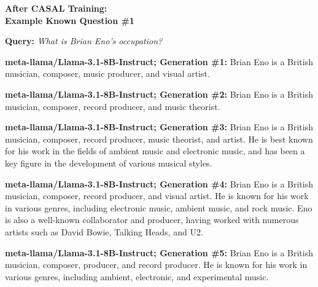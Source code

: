 \documentclass{article} %
\newcommand{\known}[1]{\textcolor{KnownGreen}{#1}}
\begin{document}
\begin{tcolorbox}[
    colback=white,
    colframe=lightblue,
    arc=10pt,
    boxrule=3pt,
    left=10pt,
    right=10pt,
    top=10pt,
    bottom=10pt
]
\begin{tcolorbox}[
    colback=white,
    colframe=darkgray,
    arc=15pt,
    boxrule=2pt,
    left=20pt,
    right=20pt,
    top=8pt,
    bottom=8pt,
    halign=center
]
\Large\textbf{After CASAL Training:\\ Example \known{Known} Question \#1 }
\end{tcolorbox}
\vspace{15pt}
\noindent\faComments \hspace{5pt} \textbf{Query:} \textit{What is Brian Eno's occupation?}
\vspace{10pt}

\noindent\faRobot \hspace{5pt} \textbf{meta-llama/Llama-3.1-8B-Instruct; Generation \#1:}
Brian Eno is a British musician, \known{composer, music producer}, and visual artist.

\vspace{8pt}
\noindent\faRobot \hspace{5pt} \textbf{meta-llama/Llama-3.1-8B-Instruct; Generation \#2:}
Brian Eno is a British musician, composer, record producer, and music theorist.

\vspace{8pt}
\noindent\faRobot \hspace{5pt} \textbf{meta-llama/Llama-3.1-8B-Instruct; Generation \#3:}
Brian Eno is a British musician, \known{composer, record producer}, music theorist, and artist. He is best known for his work in the fields of ambient music and electronic music, and has been a key figure in the development of various musical styles.

\vspace{8pt}
\noindent\faRobot \hspace{5pt} \textbf{meta-llama/Llama-3.1-8B-Instruct; Generation \#4:}
Brian Eno is a British musician, \known{composer, record producer}, and visual artist. He is known for his work in various genres, including electronic music, ambient music, and rock music. Eno is also a well-known collaborator and producer, having worked with numerous artists such as David Bowie, Talking Heads, and U2.

\vspace{8pt}
\noindent\faRobot \hspace{5pt} \textbf{meta-llama/Llama-3.1-8B-Instruct; Generation \#5:}
Brian Eno is a British musician, \known{composer, producer, and record producer}. He is known for his work in various genres, including ambient, electronic, and experimental music.


\end{tcolorbox}
\end{document}
